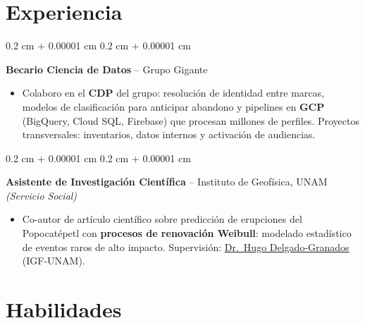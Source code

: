 \documentclass[10pt, letterpaper]{article}
\newenvironment{highlights}{
    \begin{itemize}[
        topsep=0.02 cm,
        parsep=0.05 cm,
        partopsep=0pt,
        itemsep=0pt,
        leftmargin=0.4 cm + 10pt
    ]
}{
    \end{itemize}
}
\newenvironment{onecolentry}{
    \begin{adjustwidth}{
        0.2 cm + 0.00001 cm
    }{
        0.2 cm + 0.00001 cm
    }
}{
    \end{adjustwidth}
}
\let\hrefWithoutArrow\href
\renewcommand{\href}[2]{\hrefWithoutArrow{#1}{\ifthenelse{\equal{#2}{}}{ }{#2 }\raisebox{.15ex}{\footnotesize \faExternalLink*}}}
\begin{document}
    \section{Experiencia}

        \begin{onecolentry}
            \textbf{Becario Ciencia de Datos} -- Grupo Gigante
            \begin{highlights}
                \item Colaboro en el \textbf{CDP} del grupo: resolución de identidad entre marcas, modelos de clasificación para anticipar abandono y pipelines en \textbf{GCP} (BigQuery, Cloud SQL, Firebase) que procesan millones de perfiles. Proyectos transversales: inventarios, datos internos y activación de audiencias.
            \end{highlights}
            \end{onecolentry}

        \vspace{0.02 cm}

        \begin{onecolentry}
            \textbf{Asistente de Investigación Científica} -- Instituto de Geofísica, UNAM \textit{(Servicio Social)}
            \begin{highlights}
                \item Co-autor de artículo científico sobre predicción de erupciones del Popocatépetl con \textbf{procesos de renovación Weibull}: modelado estadístico de eventos raros de alto impacto. Supervisión: \hrefWithoutArrow{https://scholar.google.com/citations?user=lDD0DZQAAAAJ}{Dr.\ Hugo Delgado-Granados} (IGF-UNAM).
            \end{highlights}
            \end{onecolentry}


    \section{Habilidades}
\end{document}
